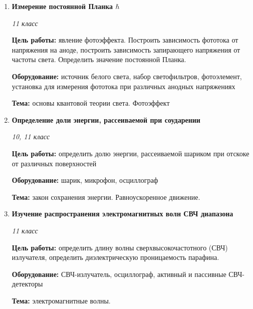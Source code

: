 \documentclass[a4paper,10pt]{article}
\newcommand{\labtitle}[5]{
	\textbf{#2}\par
	\textit{#1 класс}\par
	\textbf{Цель работы:} #3\par
	\textbf{Оборудование:} #4\par
	\textbf{Тема:} #5
}
\begin{document}
\begin{enumerate}
	\item \labtitle
		{11}
		{Измерение постоянной Планка $\hbar$}
		{явление фотоэффекта. Построить зависимость фототока от напряжения на аноде, построить зависимость запирающего напряжения от частоты света. Определить значение постоянной Планка.}
		{источник белого света, набор светофильтров, фотоэлемент, установка для измерения фототока при различных анодных напряжениях}
		{основы квантовой теории света. Фотоэффект}
	\item \labtitle
		{10, 11}
		{Определение доли энергии, рассеиваемой при соударении}
		{определить долю энергии, рассеиваемой шариком при отскоке от различных поверхностей}
		{шарик, микрофон, осциллограф}
		{закон сохранения энергии. Равноускоренное движение.}
	\item \labtitle
		{11}
		{Изучение распространения электромагнитных волн СВЧ диапазона}
		{определить длину волны сверхвысокочастотного (СВЧ) излучателя, определить диэлектрическую проницаемость парафина.}
		{СВЧ-излучатель, осциллограф, активный и пассивные СВЧ-детекторы}
		{электромагнитные волны.}

\end{enumerate}
\end{document}
